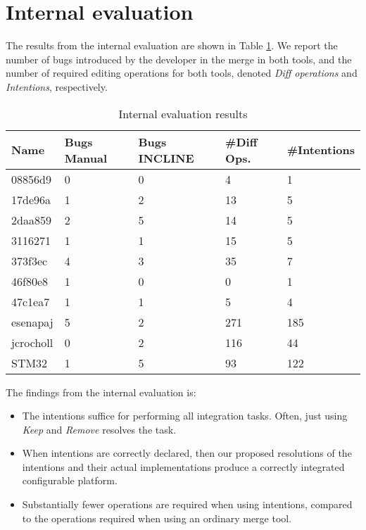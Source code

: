 \section{Internal evaluation}
The results from the internal evaluation are shown in Table \ref{tab:internalres}. We report the number of bugs introduced by the developer in the merge in both tools, and the number of required editing operations for both tools, denoted \textit{Diff operations} and \textit{Intentions}, respectively. 

\begin{table}[h]
    \centering
    \caption{Internal evaluation results}
    \label{tab:internalres}
    \begin{tabular}{l|llll}
\hline\hline
\textbf{Name} & \textbf{Bugs Manual} & \textbf{Bugs INCLINE} & \textbf{\#Diff Ops.} & \textbf{\#Intentions}\\
\hline
08856d9      & 0     & 0     & 4     & 1     \\
17de96a      & 1     & 2     & 13    & 5     \\
2daa859      & 2     & 5     & 14    & 5     \\
3116271      & 1     & 1     & 15    & 5     \\
373f3ec      & 4     & 3     & 35    & 7     \\
46f80e8      & 1     & 0     & 0     & 1     \\
47c1ea7      & 1     & 1     & 5     & 4     \\
\hline
esenapaj     & 5     & 2     & 271   & 185   \\ %
jcrocholl    & 0     & 2     & 116   & 44    \\
STM32   & 1     & 5     & 93    & 122   \\ %
\hline\hline
    \end{tabular}
\end{table}

The findings from the internal evaluation is:

\begin{itemize}
    \item The intentions suffice for performing all integration tasks. Often, just using \textit{Keep} and \textit{Remove} resolves the task.
    \item When intentions are correctly declared, then our proposed resolutions of the intentions and their actual implementations produce a correctly integrated configurable platform.
    \item Substantially fewer operations are required when using intentions, compared to the operations required when using an ordinary merge tool.
\end{itemize}

